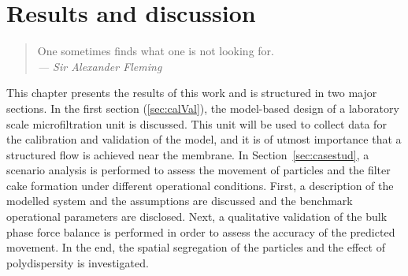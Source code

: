 \hyphenation{}
\chapter[Results and discussion]%
{Results and discussion \label{ch:results}}

\vspace{-2cm}
\begin{quote}
	One sometimes finds what one is not looking for. \\
\textit{	 --- Sir Alexander Fleming
}\end{quote}
\vspace{2cm}

This chapter presents the results of this work and is structured in two major sections. In the first section (\ref {sec:calVal}), the model-based design of a laboratory scale microfiltration unit is discussed. This unit will be used to collect data for the calibration and validation of the model, and it is of utmost importance that a structured flow is achieved near the membrane. In \mbox{Section \ref{sec:casestud}}, a scenario analysis is performed to assess the movement of particles and the filter cake formation under different operational conditions. First, a description of the modelled system and the assumptions are discussed and the benchmark operational parameters are disclosed. Next, a qualitative validation of the bulk phase force balance is performed in order to assess the accuracy of the predicted movement. In the end, the spatial segregation of the particles and the effect of polydispersity is investigated.  

